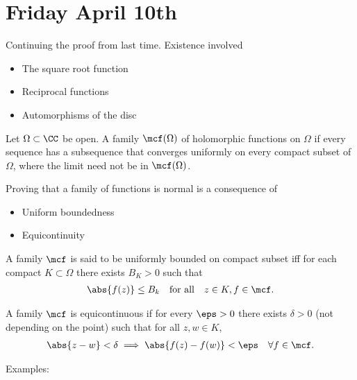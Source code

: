 \hypertarget{friday-april-10th}{%
\section{Friday April 10th}\label{friday-april-10th}}

Continuing the proof from last time. Existence involved

\begin{itemize}
\tightlist
\item
  The square root function
\item
  Reciprocal functions
\item
  Automorphisms of the disc
\end{itemize}

\begin{description}
\tightlist
\item[Definition]
Let \(\Omega \subset \CC\) be open. A family \(\mcf(\Omega)\) of
holomorphic functions on \(\Omega\) if every sequence has a subsequence
that converges uniformly on every compact subset of \(\Omega\), where
the limit need not be in \(\mcf(\Omega)\).
\end{description}

Proving that a family of functions is normal is a consequence of

\begin{itemize}
\tightlist
\item
  Uniform boundedness
\item
  Equicontinuity
\end{itemize}

\begin{description}
\tightlist
\item[Definition]
A family \(\mcf\) is said to be uniformly bounded on compact subset iff
for each compact \(K \subset \Omega\) there exists \(B_K > 0\) such that
\begin{align*}
\abs{f(z)} \leq B_k \quad\text{for all} \quad z\in K, f\in\mcf
.\end{align*}
\item[Definition]
A family \(\mcf\) is equicontinuous if for every \(\eps > 0\) there
exists \(\delta > 0\) (not depending on the point) such that for all
\(z, w\in K\), \begin{align*}
\abs{z-w} < \delta \implies \abs{f(z) - f(w)} < \eps \quad\forall f\in\mcf
.\end{align*}
\end{description}

Examples:

